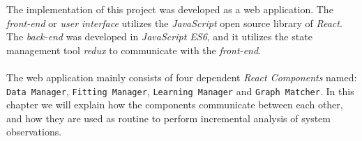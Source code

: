 %
The implementation of this project was developed as a web application. The \textit{front-end} or \textit{user interface} utilizes the \textit{JavaScript} open source library of \textit{React}. 
%
The \textit{back-end} was developed in \textit{JavaScript ES6}, and it utilizes the state management tool \textit{redux} to communicate with the \textit{front-end}. \\ \\
%
The web application mainly consists of four dependent \textit{React Components} named: \texttt{Data Manager}, \texttt{Fitting Manager}, \texttt{Learning Manager} and \texttt{Graph Matcher}. 
%
In this chapter we will explain how the components communicate between each other, and how they are used as routine to perform incremental analysis of system observations. 
%
%
%

